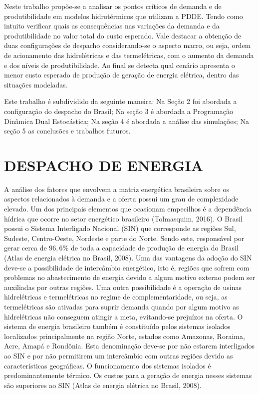 \documentclass[12pt,fleqn]{article}
\begin{document}
Neste trabalho propõe-se a analisar os pontos cr\'iticos de demanda e de produtibilidade em modelos hidrot\'ermicos que utilizam a PDDE.
Tendo como intuito verificar quais as consequ\^encias nas varia\c c\~oes da demanda e da produtibilidade no valor total do custo esperado. Vale destacar a obten\c c\~ao de duas configura\c c\~oes de despacho considerando-se o aspecto macro, ou seja, ordem de acionamento das hidrel\'etricas e das termel\'etricas, com o aumento da demanda e dos n\'iveis de produtibilidade.  Ao final se detecta qual cen\'ario apresenta o menor custo esperado de produ\c c\~ao de gera\c c\~ao de energia el\'etrica, dentro das situa\c c\~oes modeladas.

 Este trabalho \'e
subdividido da seguinte maneira: Na Se\c c\~ao 2 foi abordada a configura\c c\~ao do despacho do Brasil; Na se\c c\~ao 3
\'e abordada a Programa\c c\~ao Din\^amica Dual Estoc\'astica; Na se\c c\~ao 4 \'e abordada a an\'alise das simula\c
c\~oes; Na se\c c\~ao 5 as conclus\~oes e trabalhos futuros. 

\section{DESPACHO DE ENERGIA}
A an\'alise dos fatores que envolvem a matriz energ\'etica brasileira sobre os aspectos relacionados \`a demanda e a oferta possui um grau de complexidade elevado. Um dos principais elementos que ocasionam empecilhos \'e a depend\^encia h\'idrica que ocorre no setor energ\'etico brasileiro (Tolmasquim, 2016). O Brasil possui o Sistema Interligado Nacional (SIN) que corresponde as
regi\~oes Sul, Sudeste, Centro-Oeste, Nordeste e parte do Norte. Sendo este, respons\'avel por gerar cerca de $96,6\%$ de toda a capacidade de produ\c c\~ao de energia do Brasil (Atlas de
energia el\'etrica no Brasil, 2008). Uma das vantagens da ado\c c\~ao do SIN deve-se a possibilidade de interc\^ambio
energ\'etico, isto \'e, regi\~oes que sofrem com problemas no abastecimento  de energia devido a algum motivo externo
podem ser auxiliadas por outras regi\~oes. Uma outra possibilidade \'e a opera\c c\~ao de usinas hidrel\'etricas e termel\'etricas no
regime de complementaridade, ou seja, as termel\'etricas s\~ao ativadas para suprir demanda quando por algum motivo as
hidrel\'etricas n\~ao conseguem atingir a meta, evitando-se preju\'izos na oferta. O sistema de energia brasileiro tamb\'em \'e constitu\'ido pelos sistemas isolados localizados principalmente na regi\~ao Norte,
estados como Amazonas, Roraima, Acre, Amap\'a e Rond\^onia. Esta denomina\c c\~ao deve-se por n\~ao estarem interligados ao
SIN e por n\~ao permitirem um interc\^ambio com outras regi\~oes devido as caracter\'isticas geogr\'aficas. O
funcionamento dos
sistemas isolados \'e predominantemente t\'ermico. Os custos para a gera\c c\~ao de energia nesses sistemas s\~ao
superiores ao SIN (Atlas de
energia el\'etrica no Brasil, 2008).
\end{document}
